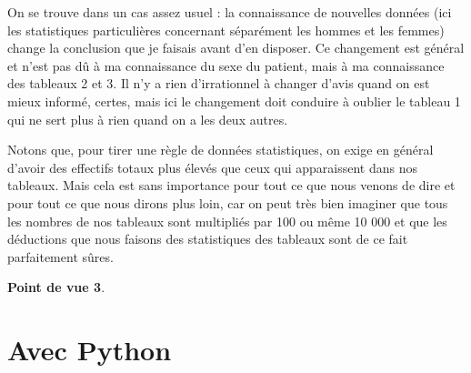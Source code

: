 \documentclass[10pt,dvipsnames, dvips, svgnames]{article}
\newcommand{\code}[1]{\fcolorbox{black}{cyan!10}{\lstinline!#1!}}
\begin{document}
\begin{list}{}{}
On se trouve dans un cas assez usuel : la connaissance de nouvelles données (ici les statistiques particulières concernant séparément les hommes et les femmes) change la conclusion que je faisais avant d'en disposer. Ce changement est général et n'est pas dû à ma connaissance du sexe du patient, mais à ma connaissance des tableaux 2 et 3. Il n'y a rien d'irrationnel à changer d'avis quand on est mieux informé, certes, mais ici le changement doit conduire à oublier le tableau 1 qui ne sert plus à rien quand on a les deux autres. 

Notons que, pour tirer une règle de données statistiques, on exige en général d'avoir des effectifs totaux plus élevés que ceux qui apparaissent dans nos tableaux. Mais cela est sans importance pour tout ce que nous venons de dire et pour tout ce que nous dirons plus loin, car on peut très bien imaginer que tous les nombres de nos tableaux sont multipliés par 100 ou même 10 000 et que les déductions que nous faisons des statistiques des tableaux sont de ce fait parfaitement sûres.







\item  \textbf{Point de vue 3}. 
\end{list}

\newpage
\section{Avec Python}

%
%
%
%
%
\end{document}

